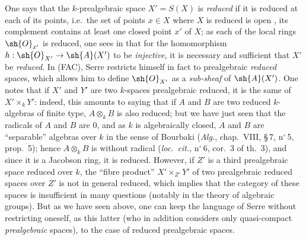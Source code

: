 \begin{env}[10.10.4]
\label{IV.10.10.4}
One says that the $k$-prealgebraic space $X'=S(X)$ is \emph{reduced} if it is reduced at each of its points, i.e.\ the set of points $x\in X$ where $X$ is reduced is open , its complement contains at least one closed point $x'$ of $X$; as each of the local rings $\sh{O}_{x'}$ is reduced, one sees in  that for the homomorphism $h:\sh{O}_{X'}\to\sh{A}(X')$ to be \emph{injective}, it is necessary and sufficient that $X'$ be \emph{reduced}.
In (FAC), Serre restricts himself in fact to prealgebraic \emph{reduced} spaces, which allows him to define $\sh{O}_{X'}$ as a \emph{sub-sheaf} of $\sh{A}(X')$.
One notes that if $X'$ and $Y'$ are two $k$-spaces prealgebraic reduced, it is the same of $X'\times_k Y'$: indeed, this amounts to saying that if $A$ and $B$ are two reduced $k$-algebras of finite type, $A\otimes_k B$ is also reduced; but we have just seen that the radicals of $A$ and $B$ are $0$, and as $k$ is algebraically closed, $A$ and $B$ are ``separable'' algebras over $k$ in the sense of Bourbaki (\emph{Alg.}, chap.~VIII, \S\,7, n$^\circ$\,5, prop.~5); hence $A\otimes_k B$ is without radical (\emph{loc.\ cit.}, n$^\circ$\,6, cor.~3 of th.~3), and since it is a Jacobson ring, it is reduced.
However, if $Z'$ is a third prealgebraic space reduced over $k$, the ``fibre product'' $X'\times_{Z'}Y'$ of two prealgebraic reduced spaces over $Z'$ is not in general reduced, which implies that the category of these spaces is insufficient in many questions (notably in the theory of algebraic groups).
But as we have seen above, one can keep the language of Serre without restricting oneself, as this latter (who in addition considers only quasi-compact \emph{prealgebraic} spaces), to the case of reduced prealgebraic spaces.
\end{env}
